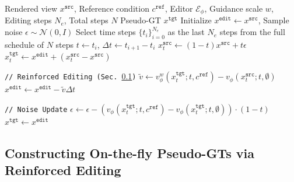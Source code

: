\documentclass[runningheads]{llncs}
\begin{document}
\begin{algorithm}[t]
    \caption{Reinforced Editing}
    \label{alg:red}
    \begin{algorithmic}[1]
    \Require Rendered view $x^{\texttt{src}}$, Reference condition $c^{\texttt{ref}}$, Editor $\mathcal{E}_\phi$, Guidance scale $w$, Editing steps $N_e$, Total steps $N$
    \Ensure Pseudo-GT $x^{\texttt{tgt}}$
    \State Initialize $x^{\texttt{edit}} \leftarrow x^{\texttt{src}}$, Sample noise $\epsilon \sim \mathcal{N}(0, I)$
    \State Select time steps $\{t_i\}_{i=0}^{N_e}$ as the last $N_e$ steps from the full schedule of $N$ steps
     
        \State $t \leftarrow t_i$, $\Delta t \leftarrow t_{i+1} - t_i$
        \State $x_t^{\texttt{src}} \leftarrow (1-t)x^{\texttt{src}} + t\epsilon$
        \State $x_t^{\texttt{tgt}} \leftarrow x^{\texttt{edit}} + (x_t^{\texttt{src}} - x^{\texttt{src}})$ 
        
        \Statex \texttt{// Reinforced Editing (Sec.~\ref{sec:reinforced_editing})}
        \State $\tilde{v} \leftarrow v_\phi^{w}(x_t^{\texttt{tgt}}; t, c^{\texttt{ref}}) - v_\phi(x_t^{\texttt{src}}; t, \emptyset)$ 
        \State $x^{\texttt{edit}} \leftarrow x^{\texttt{edit}} - \tilde{v} \Delta t$ 
    
        \Statex \texttt{// Noise Update}
        \State $\epsilon \leftarrow \epsilon - (v_\phi(x_t^{\texttt{tgt}}; t, c^{\texttt{ref}}) - v_\phi(x_t^{\texttt{tgt}}; t, \emptyset)) \cdot (1-t)$ 
    \EndFor
    \State \Return $x^{\texttt{tgt}} \leftarrow x^{\texttt{edit}}$
    \end{algorithmic}
    \end{algorithm}


\subsection{Constructing On-the-fly Pseudo-GTs via Reinforced Editing}
\label{sec:reinforced_editing}
\end{document}
